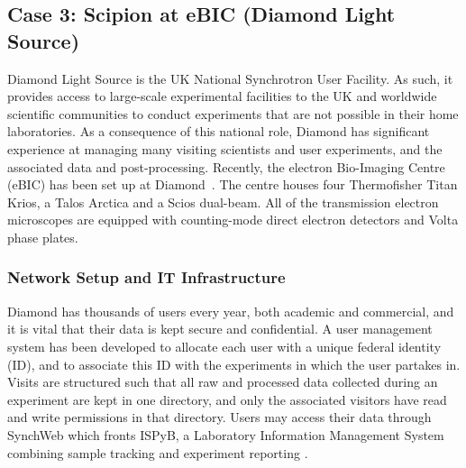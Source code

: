 
\subsection{Case 3: Scipion at eBIC (Diamond Light Source)}

Diamond Light Source is the UK National Synchrotron User Facility.  As such, it provides access to large-scale experimental facilities to the UK and worldwide scientific communities to conduct experiments that are not possible in their home laboratories.  As a consequence of this national role, Diamond has significant experience at managing many visiting scientists and user experiments, and the associated data and post-processing.  %
Recently, the electron Bio-Imaging Centre (eBIC) has been set up at Diamond~\citep{diamond2017}. The centre houses four Thermofisher Titan Krios, a Talos Arctica and a Scios dual-beam. All of the transmission electron microscopes are equipped with counting-mode direct electron detectors and Volta phase plates. 

\subsubsection{Network Setup and IT Infrastructure}

Diamond has thousands of users every year, both academic and commercial, and it is vital that their data is kept secure and confidential. A user management system
has been developed to allocate each user with a unique federal identity (ID),
and to associate this ID with the experiments in which the user partakes in.
 Visits are structured such that all raw and processed data collected during an experiment are kept in one directory, and only the associated visitors have read and write permissions in that directory. Users may access their data through SynchWeb which fronts ISPyB, a Laboratory Information Management System combining sample tracking and experiment reporting \citep{Delageniere2011:ispb, Fisher2015:synchweb}.
 
